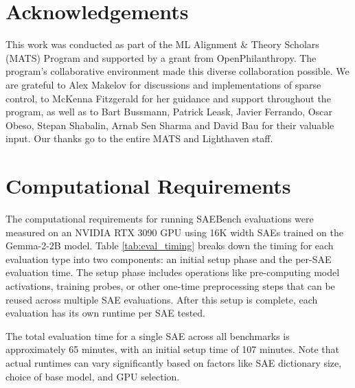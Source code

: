 \documentclass{article}
\theoremstyle{plain}
\theoremstyle{definition}
\theoremstyle{remark}
\begin{document}
\section*{Acknowledgements}
This work was conducted as part of the ML Alignment \& Theory Scholars (MATS) Program and supported by a grant from OpenPhilanthropy. The program's collaborative environment made this diverse collaboration possible. We are grateful to Alex Makelov for discussions and implementations of sparse control, to McKenna Fitzgerald for her guidance and support throughout the program, as well as to Bart Bussmann, Patrick Leask, Javier Ferrando, Oscar Obeso, Stepan Shabalin, Arnab Sen Sharma and David Bau for their valuable input. Our thanks go to the entire MATS and Lighthaven staff.



\clearpage



\newpage
\appendix
\onecolumn

\section{Computational Requirements}

The computational requirements for running SAEBench evaluations were measured on an NVIDIA RTX 3090 GPU using 16K width SAEs trained on the Gemma-2-2B model. Table \ref{tab:eval_timing} breaks down the timing for each evaluation type into two components: an initial setup phase and the per-SAE evaluation time. The setup phase includes operations like pre-computing model activations, training probes, or other one-time preprocessing steps that can be reused across multiple SAE evaluations. After this setup is complete, each evaluation has its own runtime per SAE tested.

The total evaluation time for a single SAE across all benchmarks is approximately 65 minutes, with an initial setup time of 107 minutes. Note that actual runtimes can vary significantly based on factors like SAE dictionary size, choice of base model, and GPU selection.
\end{document}
